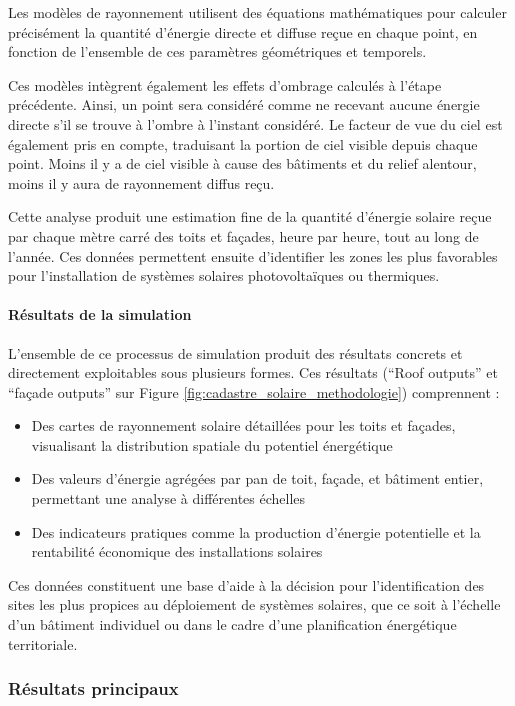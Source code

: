 Les modèles de rayonnement utilisent des équations mathématiques pour calculer précisément la quantité d'énergie directe et diffuse reçue en chaque point, en fonction de l'ensemble de ces paramètres géométriques et temporels.

Ces modèles intègrent également les effets d'ombrage calculés à l'étape précédente. Ainsi, un point sera considéré comme ne recevant aucune énergie directe s'il se trouve à l'ombre à l'instant considéré. Le facteur de vue du ciel est également pris en compte, traduisant la portion de ciel visible depuis chaque point. Moins il y a de ciel visible à cause des bâtiments et du relief alentour, moins il y aura de rayonnement diffus reçu.

Cette analyse produit une estimation fine de la quantité d'énergie solaire reçue par chaque mètre carré des toits et façades, heure par heure, tout au long de l'année. Ces données permettent ensuite d'identifier les zones les plus favorables pour l'installation de systèmes solaires photovoltaïques ou thermiques.

\paragraph{Résultats de la simulation}

L'ensemble de ce processus de simulation produit des résultats concrets et directement exploitables sous plusieurs formes. Ces résultats (``Roof outputs'' et ``façade outputs'' sur Figure \ref{fig:cadastre_solaire_methodologie}) comprennent :

\begin{itemize}
    \item Des cartes de rayonnement solaire détaillées pour les toits et façades, visualisant la distribution spatiale du potentiel énergétique
    \item Des valeurs d'énergie agrégées par pan de toit, façade, et bâtiment entier, permettant une analyse à différentes échelles
    \item Des indicateurs pratiques comme la production d'énergie potentielle et la rentabilité économique des installations solaires
\end{itemize}

Ces données constituent une base d'aide à la décision pour l'identification des sites les plus propices au déploiement de systèmes solaires, que ce soit à l'échelle d'un bâtiment individuel ou dans le cadre d'une planification énergétique territoriale.

\subsubsection{Résultats principaux}

